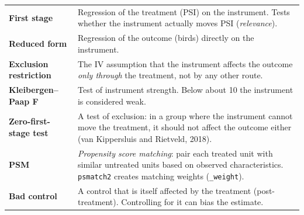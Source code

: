 \documentclass[11pt]{article}
\begin{document}
\begin{table}[H]
\begin{tabularx}{\linewidth}{>{\bfseries}l>{\raggedright\arraybackslash}X}
First stage & Regression of the treatment (PSI) on the instrument. Tests whether the instrument actually moves PSI (\emph{relevance}).\\
Reduced form & Regression of the outcome (birds) directly on the instrument.\\
Exclusion restriction & The IV assumption that the instrument affects the outcome \emph{only through} the treatment, not by any other route.\\
Kleibergen--Paap F & Test of instrument strength. Below about 10 the instrument is considered weak.\\
Zero-first-stage test & A test of exclusion: in a group where the instrument cannot move the treatment, it should not affect the outcome either (van Kippersluis and Rietveld, 2018).\\
PSM & \emph{Propensity score matching}: pair each treated unit with similar untreated units based on observed characteristics. \texttt{psmatch2} creates matching weights (\texttt{\_weight}).\\
Bad control & A control that is itself affected by the treatment (post-treatment). Controlling for it can bias the estimate.\\
\bottomrule
\end{tabularx}
\end{table}
\end{document}
